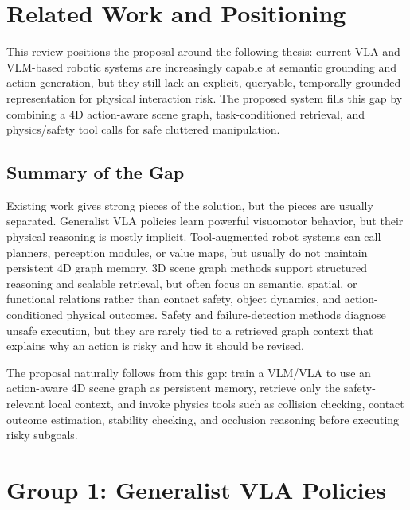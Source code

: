 
\section*{Related Work and Positioning}

This review positions the proposal around the following thesis: current VLA and VLM-based robotic systems are increasingly capable at semantic grounding and action generation, but they still lack an explicit, queryable, temporally grounded representation for physical interaction risk. The proposed system fills this gap by combining a 4D action-aware scene graph, task-conditioned retrieval, and physics/safety tool calls for safe cluttered manipulation.

\subsection*{Summary of the Gap}

Existing work gives strong pieces of the solution, but the pieces are usually separated. Generalist VLA policies learn powerful visuomotor behavior, but their physical reasoning is mostly implicit. Tool-augmented robot systems can call planners, perception modules, or value maps, but usually do not maintain persistent 4D graph memory. 3D scene graph methods support structured reasoning and scalable retrieval, but often focus on semantic, spatial, or functional relations rather than contact safety, object dynamics, and action-conditioned physical outcomes. Safety and failure-detection methods diagnose unsafe execution, but they are rarely tied to a retrieved graph context that explains why an action is risky and how it should be revised.

The proposal naturally follows from this gap: train a VLM/VLA to use an action-aware 4D scene graph as persistent memory, retrieve only the safety-relevant local context, and invoke physics tools such as collision checking, contact outcome estimation, stability checking, and occlusion reasoning before executing risky subgoals.

\section*{Group 1: Generalist VLA Policies}

